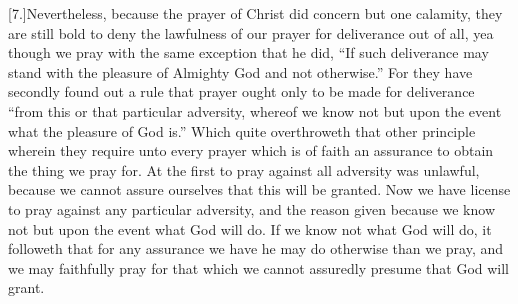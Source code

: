 [7.]Nevertheless, because the prayer of Christ did concern but one calamity, they are still bold to deny the lawfulness of our prayer for deliverance out of all, yea though we pray with the same exception that he did, “If such deliverance may stand with the pleasure of Almighty God and not otherwise.” For they have secondly found out a rule that prayer ought only to be made for deliverance “from this or that particular adversity, whereof we know not but upon the event what the pleasure of God is.” Which  quite overthroweth that other principle wherein they require unto every prayer which is of faith an assurance to obtain the thing we pray for.
 At the first to pray against all adversity was unlawful, because we cannot assure ourselves that this will be granted. Now we have license to pray against any particular adversity, and the reason given because we know not but upon the event what God will do. If we know not what God will do, it followeth that for any assurance we have he may do otherwise than we pray, and we may faithfully pray for that which we cannot assuredly presume that God will grant.

